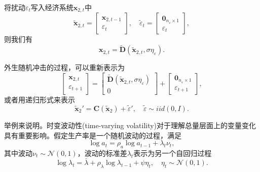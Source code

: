 将扰动$\varepsilon_{t}$写入经济系统$\bm{x}_{2,t}$中
\begin{equation*}
  \tilde{\bm{x}}_{2,t} = \begin{bmatrix} \bm{x}_{2,t-1} \\ \varepsilon_t \end{bmatrix}, \quad \tilde{\varepsilon}_{t} = \begin{bmatrix} {\bm{0}_{n_{\varepsilon} \times 1}} \\ \varepsilon_{t} \end{bmatrix},
\end{equation*}
则我们有
\begin{equation*}
  \bm{x}_{2,t} = \tilde{\bm{D}}(\tilde{\bm{x}}_{2,t}, \sigma \eta_{\varepsilon}).
\end{equation*}

外生随机冲击的过程，可以重新表示为
\begin{equation*}
  \begin{bmatrix}
    \bm{x}_{2,t} \\ \varepsilon_{t+1}
  \end{bmatrix}
  = \begin{bmatrix}
  \tilde{\bm{D}}(\tilde{\bm{x}}_{2,t}, \sigma \eta_{\varepsilon}) \\
  0
\end{bmatrix} + \begin{bmatrix}
{\bm{0}_{n_{\varepsilon} \times 1}} \\ \varepsilon_{t+1}
\end{bmatrix},
\end{equation*}
或者用递归形式来表示
\begin{equation*}
  \tilde{\bm{x}}_{2}' = \bm{C}(\tilde{\bm{x}}_{2}) + \tilde{\varepsilon}', \quad \tilde{\varepsilon} \sim iid (0,I).
\end{equation*}

举例来说明。时变波动性(time-varying volatility)对于理解总量层面上的变量变化具有重要影响\citep{Bloom:2009vg, FernandezVillaverde:2011us}。假定生产率是一个随机波动的过程，满足
\begin{equation*}
  \log a_t = \rho_a \log a_{t-1} + \lambda_t \nu_t,
\end{equation*}
其中波动$\nu_t \sim \mathcal{N}(0,1)$，波动的标准差$\lambda_t$表示为另一个自回归过程
\begin{equation*}
  \log \lambda_t = \bar{\lambda} + \rho_{\lambda} \log \lambda_{t-1} + \psi \eta_t, \quad \eta_t \sim \mathcal{N}(0,1).
\end{equation*}

